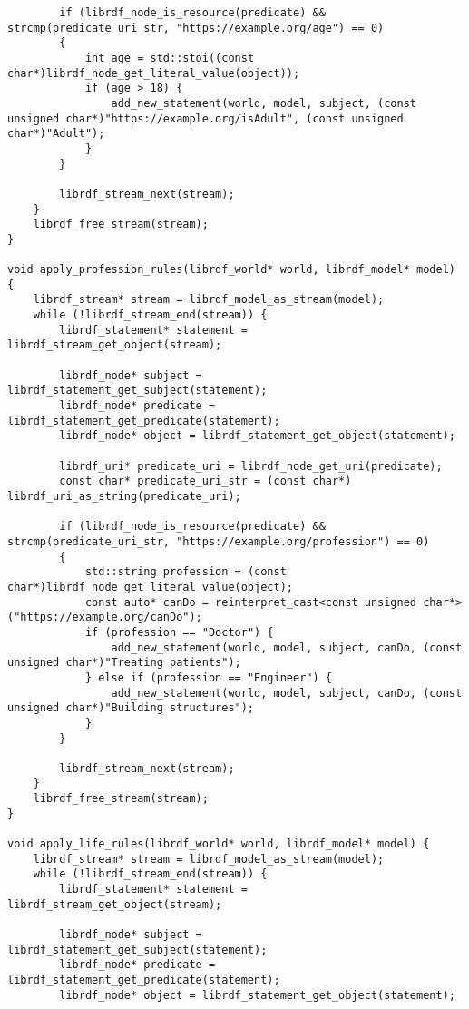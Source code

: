 \documentclass[12pt, a4paper]{article}
\begin{document}
\begin{verbatim}
        if (librdf_node_is_resource(predicate) && strcmp(predicate_uri_str, "https://example.org/age") == 0)
        {
            int age = std::stoi((const char*)librdf_node_get_literal_value(object));
            if (age > 18) {
                add_new_statement(world, model, subject, (const unsigned char*)"https://example.org/isAdult", (const unsigned char*)"Adult");
            }
        }

        librdf_stream_next(stream);
    }
    librdf_free_stream(stream);
}

void apply_profession_rules(librdf_world* world, librdf_model* model) {
    librdf_stream* stream = librdf_model_as_stream(model);
    while (!librdf_stream_end(stream)) {
        librdf_statement* statement = librdf_stream_get_object(stream);

        librdf_node* subject = librdf_statement_get_subject(statement);
        librdf_node* predicate = librdf_statement_get_predicate(statement);
        librdf_node* object = librdf_statement_get_object(statement);

        librdf_uri* predicate_uri = librdf_node_get_uri(predicate);
        const char* predicate_uri_str = (const char*) librdf_uri_as_string(predicate_uri);

        if (librdf_node_is_resource(predicate) && strcmp(predicate_uri_str, "https://example.org/profession") == 0)
        {
            std::string profession = (const char*)librdf_node_get_literal_value(object);
            const auto* canDo = reinterpret_cast<const unsigned char*>("https://example.org/canDo");
            if (profession == "Doctor") {
                add_new_statement(world, model, subject, canDo, (const unsigned char*)"Treating patients");
            } else if (profession == "Engineer") {
                add_new_statement(world, model, subject, canDo, (const unsigned char*)"Building structures");
            }
        }

        librdf_stream_next(stream);
    }
    librdf_free_stream(stream);
}

void apply_life_rules(librdf_world* world, librdf_model* model) {
    librdf_stream* stream = librdf_model_as_stream(model);
    while (!librdf_stream_end(stream)) {
        librdf_statement* statement = librdf_stream_get_object(stream);

        librdf_node* subject = librdf_statement_get_subject(statement);
        librdf_node* predicate = librdf_statement_get_predicate(statement);
        librdf_node* object = librdf_statement_get_object(statement);


\end{verbatim}
\end{document}
